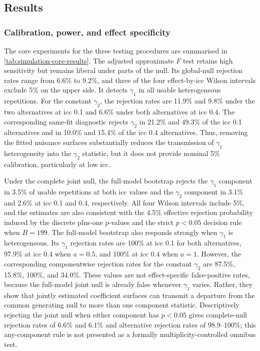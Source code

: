 \documentclass[times]{interact}
\theoremstyle{plain}%
\theoremstyle{definition}
\theoremstyle{remark}
\begin{document}
\subsection{Results}\label{sec:simulation-results}

\subsubsection{Calibration, power, and effect specificity}



The core experiments for the three testing procedures are summarised in \autoref{tab:simulation-core-results}.
The adjusted approximate $F$ test retains high sensitivity but remains liberal under parts of the null.
Its global-null rejection rates range from 6.6\% to 9.2\%, and three of the four effect-by-\gls{icc} Wilson intervals exclude 5\% on the upper side.
It detects $\gamma_1$ in all usable heterogeneous repetitions.
For the constant $\gamma_2$, the rejection rates are 11.9\% and 9.8\% under the two alternatives at \gls{icc} 0.1 and 6.6\% under both alternatives at \gls{icc} 0.4.
The corresponding same-fit diagnostic rejects $\gamma_2$ in 21.2\% and 49.3\% of the \gls{icc} 0.1 alternatives and in 10.0\% and 15.4\% of the \gls{icc} 0.4 alternatives.
Thus, removing the fitted nuisance surfaces substantially reduces the transmission of $\gamma_1$ heterogeneity into the $\gamma_2$ statistic, but it does not provide nominal 5\% calibration, particularly at low \gls{icc}.

Under the complete joint null, the full-model bootstrap rejects the $\gamma_1$ component in 3.5\% of usable repetitions at both \gls{icc} values and the $\gamma_2$ component in 3.1\% and 2.6\% at \gls{icc} 0.1 and 0.4, respectively.
All four Wilson intervals include 5\%, and the estimates are also consistent with the 4.5\% effective rejection probability induced by the discrete plus-one $p$-values and the strict $p<0.05$ decision rule when $B=199$.
The full-model bootstrap also responds strongly when $\gamma_1$ is heterogeneous.
Its $\gamma_1$ rejection rates are 100\% at \gls{icc} 0.1 for both alternatives, 97.9\% at \gls{icc} 0.4 when $a=0.5$, and 100\% at \gls{icc} 0.4 when $a=1$.
However, the corresponding componentwise rejection rates for the constant $\gamma_2$ are 87.5\%, 15.8\%, 100\%, and 34.0\%.
These values are not effect-specific false-positive rates, because the full-model joint null is already false whenever $\gamma_1$ varies.
Rather, they show that jointly estimated coefficient surfaces can transmit a departure from the common generating null to more than one component statistic.
Descriptively rejecting the joint null when either component has $p<0.05$ gives complete-null rejection rates of 6.6\% and 6.1\% and alternative rejection rates of 98.9--100\%; this any-component rule is not presented as a formally multiplicity-controlled omnibus test.
\end{document}
